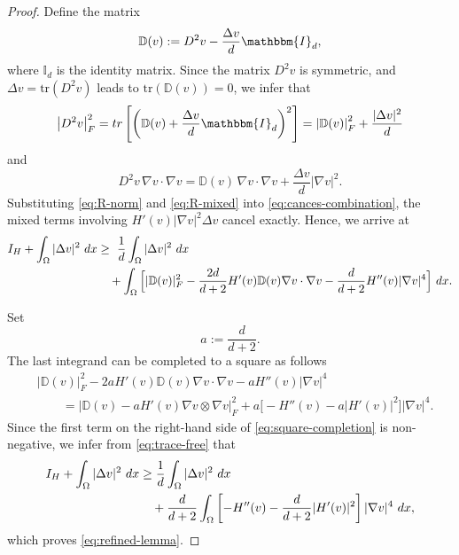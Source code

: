 \documentclass[10pt,a4paper]{amsart}
\newcommand{\dx}{\textup{d}x}
\begin{document}
\begin{proof}
Define the matrix
\[
    \mathbb{D}(v)
    :=
    D^2v-\frac{\Delta v}{d}\mathbbm{I}_d,
\]
where $\mathbb{I}_d$ is the identity matrix.
Since the matrix $D^2 v$ is symmetric,
and 
$\Delta v= \textrm{tr}(D^2 v)$ leads to $\textrm{tr}\left(  \mathbb{D}(v) \right)=0$, we infer that
\begin{equation}
\label{eq:R-norm}
\left|D^2 v \right|_F^2
= \textrm{tr}\left[ \left(  \mathbb{D}(v)  +\dfrac{\Delta v}{d} \mathbbm{I}_d\right)^2\right]
= \left|  \mathbb{D}(v)  \right|_F^2+\dfrac{|\Delta v|^2}{d}
\end{equation}
and
\begin{equation}
\label{eq:R-mixed}
    D^2v\,\nabla v \cdot \nabla v
    =
  \mathbb{D}(v) \, \nabla v \cdot \nabla v
    +
    \frac{\Delta v}{d}|\nabla v|^2.
\end{equation}
Substituting \eqref{eq:R-norm} and \eqref{eq:R-mixed} into
\eqref{eq:cances-combination}, the mixed terms involving
$H'(v)|\nabla v|^2\Delta v$ cancel exactly. Hence, we arrive at
\begin{align}
    I_H+\int_\Omega|\Delta v|^2\ \dx
    & \geq \
    \frac1d \int_\Omega|\Delta v|^2\ \dx
    \nonumber\\
    &\quad +
    \int_\Omega
    \Big[
        | \mathbb{D}(v) |_F^2
        -
        \frac{2d}{d+2}
        H'(v)   \mathbb{D}(v) \nabla v \cdot \nabla v
        -
        \frac{d}{d+2}
        H''(v)|\nabla v|^4
    \Big]\ \dx.
\label{eq:trace-free}
\end{align}

Set
\[
    a:=\frac{d}{d+2}.
\]
The last integrand can be completed to a square as follows
\begin{align}
    &| \mathbb{D}(v) |_F^2
    -
    2a H'(v)  \mathbb{D}(v) \nabla v \cdot \nabla v
    -
    aH''(v)|\nabla v|^4
    \nonumber\\
    &\qquad=
    \left|
         \mathbb{D}(v) -aH'(v)\nabla v\otimes\nabla v
    \right|_F^2
    +
    a
    \Big[
        -H''(v)-a|H'(v)|^2
    \Big]
    |\nabla v|^4.
\label{eq:square-completion}
\end{align}
Since the first term on the right-hand side of
\eqref{eq:square-completion} is non-negative, we infer from
\eqref{eq:trace-free} that
\begin{align}
    I_H+\int_\Omega|\Delta v|^2\ \dx
    &\geq
    \frac1d \int_\Omega|\Delta v|^2\ \dx
    \nonumber\\
    &\quad 
    +
    \frac{d}{d+2}
    \int_\Omega
    \left[
        -H''(v)
        -
        \frac{d}{d+2}|H'(v)|^2
    \right]
    |\nabla v|^4\ \dx,
\end{align}
which proves \eqref{eq:refined-lemma}.
\end{proof}
\end{document}
